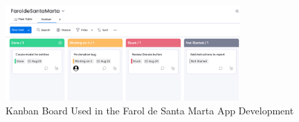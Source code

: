 \begin{figure}[h]
    \centering
    \includegraphics[width=0.8\textwidth]{images/kanban.png}
    \caption{Kanban Board Used in the Farol de Santa Marta App Development}
    \label{fig:kanban}
\end{figure}


